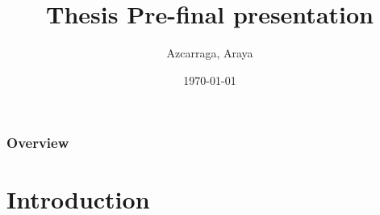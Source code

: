 \documentclass{beamer}
\title[Short title]{Thesis Pre-final presentation} %
\author{Azcarraga, Araya} %
\institute[Department of Computer Science, University of the Philippine - Diliman] %
{
University of the Philippine - Diliman\\ %
\medskip
}
\date{\today} %
\begin{document}
\begin{frame}
\titlepage %
\end{frame}

\begin{frame}
\frametitle{Overview} %
\tableofcontents %
\end{frame}


\section{Introduction}


    
    
    
\end{document}
